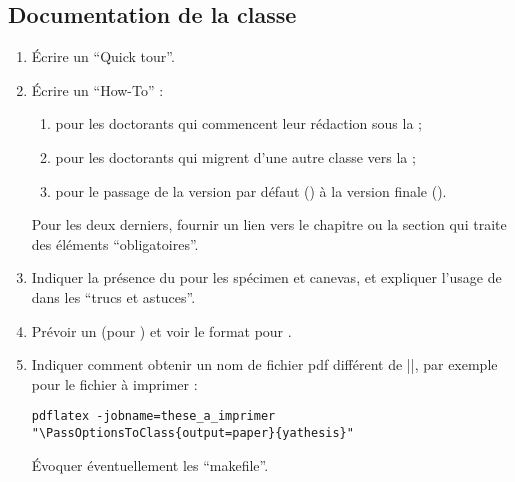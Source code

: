 \subsection{Documentation de la classe}
\label{sec-documentation-de-la-ult}

\begin{enumerate}
\item Écrire un \foreignquote{english}{Quick tour}.
\item Écrire un \foreignquote{english}{How-To} :
  \begin{enumerate}
  \item pour les doctorants qui commencent leur rédaction sous la \yatCl{} ;
  \item pour les doctorants qui migrent d'une autre classe vers la \yatCl{} ;
  \item pour le passage de la version par défaut () à la
    version finale ().
  \end{enumerate}
  Pour les deux derniers, fournir un lien vers le chapitre ou la section qui
  traite des éléments \enquote{obligatoires}.
\item Indiquer la présence du  pour les spécimen et canevas, et
  expliquer l'usage de  dans les \enquote{trucs et astuces}.
\item Prévoir un  (pour ) et voir le format
  pour .
\item Indiquer comment obtenir un nom de fichier \acrshort{pdf} différent de
  |\jobname|, par exemple pour le fichier à imprimer :
  \lstset{escapechar=}
\begin{lstlisting}
pdflatex -jobname=these_a_imprimer "\PassOptionsToClass{output=paper}{yathesis}"
\end{lstlisting}
  \lstset{escapechar="}%
Évoquer éventuellement les \enquote{makefile}.
\end{enumerate}

